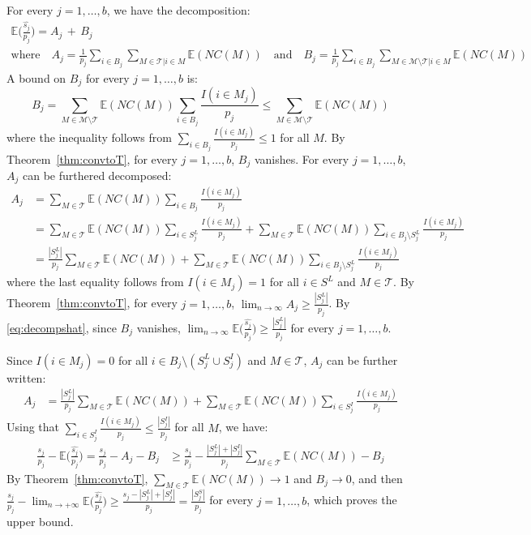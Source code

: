 \documentclass[aos]{imsart}
\theoremstyle{plain}
\newcommand{\E}{\mathbb{E}}
\newcommand{\M}{\mathcal{M}}
\newcommand{\T}{\mathcal{T}}
\begin{document}
For every $j=1,\ldots,b$, we have the decomposition:
\begin{gather}\label{eq:decompshat}
    \E\bigg(\frac{\widehat{s_j}}{p_j}\bigg)
   =A_j\,+\, B_j \\
       \text{where} \quad A_j=\frac{1}{p_j}\sum_{i \in B_j}\sum_{M \in \T|i\in M}\E(NC(M)) \quad\text{and}\quad  B_j=\frac{1}{p_j}\sum_{i \in B_j}\sum_{M \in \M\setminus \T|i\in M}\E(NC(M)) \nonumber
\end{gather}
A bound on $B_j$ for every $j=1,\ldots,b$ is:
$$B_j = \sum_{M \in \M\setminus \T}\E(NC(M))\sum_{i \in B_j}\frac{I(i\in M_j)}{p_j}\leq \sum_{M \in \M\setminus \T}\E(NC(M)) $$
where the inequality follows from $\sum_{i \in B_j}\frac{I(i\in M_j)}{p_j}\leq 1$ for all $M$. By Theorem~\ref{thm:convtoT}, for every $j=1,\ldots,b$, $B_j$ vanishes.
For every $j=1,\ldots,b$, $A_j$ can be furthered decomposed:
\begin{align*}
  A_j
   &= \sum_{M \in \T}\E(NC(M))\sum_{i \in B_j}\frac{I(i\in M_j)}{p_j}\\
   &= \sum_{M \in \T}\E(NC(M))\sum_{i \in S^L_j}\frac{I(i\in M_j)}{p_j}+\sum_{M \in \T}\E(NC(M))\sum_{i \in B_j\setminus S^L_j}\frac{I(i\in M_j)}{p_j}\\
   &= \frac{|S^L_j|}{p_j}\sum_{M \in \T}\E(NC(M))+\sum_{M \in \T}\E(NC(M))\sum_{i \in B_j\setminus S^L_j}\frac{I(i\in M_j)}{p_j}
\end{align*}
where the last equality follows from $I(i\in M_j)=1$ for all $i\in S^L$ and $M\in\T$. By  Theorem~\ref{thm:convtoT}, for every $j=1,\ldots,b$, $\lim_{n\to\infty}A_j \geq \frac{|S^L_j|}{p_j}$. By \eqref{eq:decompshat}, since $B_j$ vanishes, $\lim_{n\to\infty}\E\Big(\frac{\widehat{s_j}}{p_j}\Big)\geq \frac{|S^L_j|}{p_j}$ for every $j=1,\ldots,b$.

Since $I(i\in M_j)=0$ for all $i\in B_j\setminus(S^L_j\cup S^I_j)$ and $M\in\T$, $A_j$ can be further written:
\begin{align*}
  A_j
   &= \frac{|S^L_j|}{p_j}\sum_{M \in \T}\E(NC(M))+\sum_{M \in \T}\E(NC(M))\sum_{i \in S^I_j}\frac{I(i\in M_j)}{p_j}
\end{align*}
Using that $\sum_{i \in S^I_j}\frac{I(i\in M_j)}{p_j}\leq \frac{|S^I_j|}{p_j}$ for all $M$, we have:
\begin{align*}
    \frac{s_j}{p_j}-\E\bigg(\frac{\widehat{s_j}}{p_j}\bigg) = \frac{s_j}{p_j}-A_j - B_j
    &\geq \frac{s_j}{p_j}- \frac{|S^L_j|+|S^I_j|}{p_j}\sum_{M \in \T}\E(NC(M)) - B_j
\end{align*}
By Theorem~\ref{thm:convtoT}, $\sum_{M \in \T}\E(NC(M))\to 1$ and $B_j\to 0$, and then $ \frac{s_j}{p_j}-\lim_{n\to+\infty}\E\big(\frac{\widehat{s_j}}{p_j}\big) \geq  \frac{s_j-|S^L_j|+|S^I_j|}{p_j}= \frac{|S^S_j|}{p_j}$ for every $j=1,\ldots,b$, which proves the upper bound.
\end{document}
